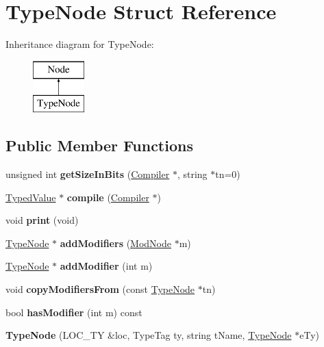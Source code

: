 \hypertarget{structTypeNode}{}\section{Type\+Node Struct Reference}
\label{structTypeNode}
Inheritance diagram for Type\+Node\+:\begin{figure}[H]
\begin{center}
\leavevmode
\includegraphics[height=2.000000cm]{structTypeNode}
\end{center}
\end{figure}
\subsection*{Public Member Functions}
\begin{DoxyCompactItemize}
\item 
\mbox{\label{structTypeNode_abcc7d31031ba5aa91ad2447106d18fe1}} 
unsigned int {\bfseries get\+Size\+In\+Bits} (\hyperlink{structante_1_1Compiler}{Compiler} $\ast$, string $\ast$tn=0)
\item 
\mbox{\label{structTypeNode_a76f508e7ee782d4b6df33cd1a4dc47ff}} 
\hyperlink{structTypedValue}{Typed\+Value} $\ast$ {\bfseries compile} (\hyperlink{structante_1_1Compiler}{Compiler} $\ast$)
\item 
\mbox{\label{structTypeNode_a337971d5c4deda16361a8ead384713df}} 
void {\bfseries print} (void)
\item 
\mbox{\label{structTypeNode_a3b502912f8aa88a8b813c35b6a7ea080}} 
\hyperlink{structTypeNode}{Type\+Node} $\ast$ {\bfseries add\+Modifiers} (\hyperlink{structModNode}{Mod\+Node} $\ast$m)
\item 
\mbox{\label{structTypeNode_aa4dbea17d7a305d96480fb96f1881b2b}} 
\hyperlink{structTypeNode}{Type\+Node} $\ast$ {\bfseries add\+Modifier} (int m)
\item 
\mbox{\label{structTypeNode_a87096f107fb3a11b33550d440022709e}} 
void {\bfseries copy\+Modifiers\+From} (const \hyperlink{structTypeNode}{Type\+Node} $\ast$tn)
\item 
\mbox{\label{structTypeNode_af3bc1ea7c51b54e163c975cc03565f81}} 
bool {\bfseries has\+Modifier} (int m) const
\item 
\mbox{\label{structTypeNode_a155b3715b7db5b4a2ef5f4b3fac4819e}} 
{\bfseries Type\+Node} (L\+O\+C\+\_\+\+TY \&loc, Type\+Tag ty, string t\+Name, \hyperlink{structTypeNode}{Type\+Node} $\ast$e\+Ty)
\end{DoxyCompactItemize}
